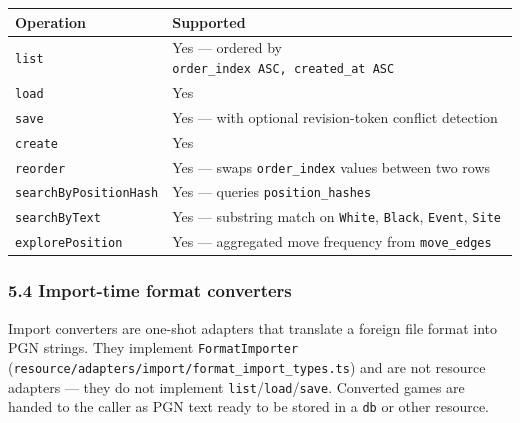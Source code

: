 \documentclass[]{article}
\begin{document}
\begin{longtable}[]{@{}ll@{}}
\toprule
Operation & Supported\tabularnewline
\midrule
\endhead
\texttt{list} & Yes --- ordered by
\texttt{order\_index\ ASC,\ created\_at\ ASC}\tabularnewline
\texttt{load} & Yes\tabularnewline
\texttt{save} & Yes --- with optional revision-token conflict
detection\tabularnewline
\texttt{create} & Yes\tabularnewline
\texttt{reorder} & Yes --- swaps \texttt{order\_index} values between
two rows\tabularnewline
\texttt{searchByPositionHash} & Yes --- queries
\texttt{position\_hashes}\tabularnewline
\texttt{searchByText} & Yes --- substring match on \texttt{White},
\texttt{Black}, \texttt{Event}, \texttt{Site}\tabularnewline
\texttt{explorePosition} & Yes --- aggregated move frequency from
\texttt{move\_edges}\tabularnewline
\bottomrule
\end{longtable}

\subsubsection{5.4 Import-time format
converters}\label{import-time-format-converters}

Import converters are one-shot adapters that translate a foreign file
format into PGN strings. They implement \texttt{FormatImporter}
(\texttt{resource/adapters/import/format\_import\_types.ts}) and are not
resource adapters --- they do not implement
\texttt{list}/\texttt{load}/\texttt{save}. Converted games are handed to
the caller as PGN text ready to be stored in a \texttt{db} or other
resource.
\end{document}

